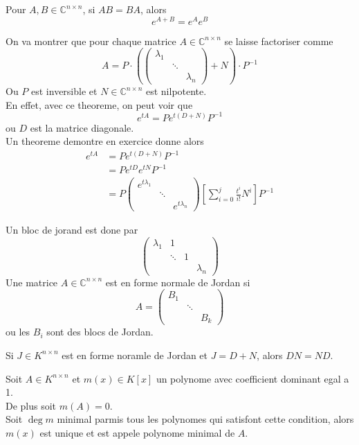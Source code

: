 \documentclass[../main.tex]{subfiles}
\begin{document}
\begin{lemma}
Pour $A,B \in \mathbb{C}^{n\times n}$, si $AB=BA$, alors 
\[ 
e^{A+B}  = e^{A} e^{B} 
\]
\end{lemma}
On va montrer que pour chaque matrice $A \in \mathbb{C}^{n\times n}$ se laisse factoriser comme
\[ 
A = P \cdot 
( \begin{pmatrix}
	\lambda_1 & & \\
		  & \ddots & \\
		  && \lambda_n
\end{pmatrix} +N  )\cdot P^{-1}
\]
Ou $P$ est inversible et $N \in \mathbb{C}^{n\times n}$ est nilpotente.\\
En effet, avec ce theoreme, on peut voir que
\[ 
	e^{tA}  = P e^{t ( D+N) } P^{-1}
\]
ou $D$ est la matrice diagonale.\\
Un theoreme demontre en exercice donne alors
\begin{align*}
	e^{tA}  &= P e^{ t( D+N) } P^{-1}\\
	&= P e^{t D}  e^{tN} P^{-1}\\
	&= P
	\begin{pmatrix}
		e^{t \lambda_1}  & & \\
				 & \ddots & \\
				 & & e^{t \lambda_n} 
	\end{pmatrix} \left[ \sum_{i=0}^{ j} \frac{t^{i}}{i!}N^{i}\right] P^{-1}
\end{align*}
\begin{defn}
Un bloc de jorand est done par
\[ 
\begin{pmatrix}
	\lambda_1 & 1 & & \\
		  & \ddots & 1 & \\
		  & & & \lambda_n
\end{pmatrix} 
\]
Une matrice $A \in \mathbb{C}^{n\times n}$ est en forme normale de Jordan si 
\[ 
A = \begin{pmatrix}
	B_1 & & \\
	    & \ddots & \\
	    & & B_k
\end{pmatrix} 
\]
ou les $B_i$ sont des blocs de Jordan.
\end{defn}
\begin{lemma}
Si $J \in K^{n\times n}$ est en forme noramle de Jordan et $J = D +N$, alors $DN = ND$.
\end{lemma}
\begin{thm}
	Soit $A \in K^{n\times n}$ et $m( x) \in K[x]$ un polynome avec coefficient dominant egal a 1.\\
	De plus soit $m( A) =0$.\\
	Soit $\deg m $ minimal parmis tous les polynomes qui satisfont cette condition, alors $m( x) $ est unique et est appele polynome minimal de $A$.
\end{thm}
\end{document}

